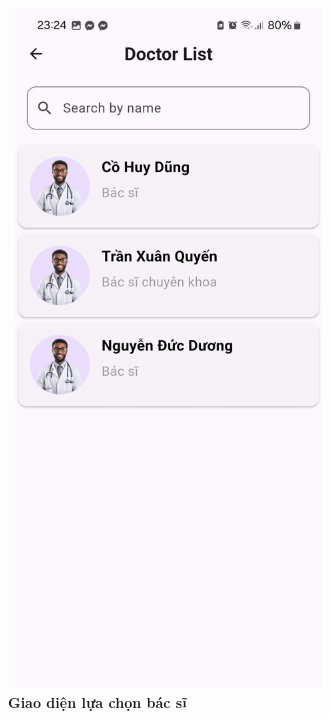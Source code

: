 \begin{figure}[H]
	\centering
	\includegraphics[width=8.5cm,height=18cm]{Images/AppUI/pickDoctor.jpg}
	\caption[Giao diện lựa chọn bác sĩ]{\bfseries \fontsize{12pt}{0pt}\selectfont Giao diện lựa chọn bác sĩ}
	\label{DoctorList}
\end{figure}
